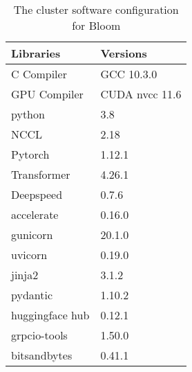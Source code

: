 \begin{table}[ht]
    \centering
    \caption{The cluster software configuration for Bloom}
    \begin{tabular}{ll}
        \toprule
        Libraries & Versions  \\
        \midrule
        C Compiler & GCC 10.3.0 \\
        GPU Compiler & CUDA nvcc 11.6 \\
        python & 3.8 \\
        NCCL & 2.18 \\
        Pytorch & 1.12.1 \\
        Transformer & 4.26.1 \\
        Deepspeed & 0.7.6 \\
        accelerate & 0.16.0  \\
        gunicorn & 20.1.0 \\
        uvicorn & 0.19.0 \\
        jinja2 & 3.1.2 \\
        pydantic & 1.10.2 \\
        huggingface hub & 0.12.1 \\
        grpcio-tools & 1.50.0 \\
        bitsandbytes & 0.41.1 \\

        \bottomrule
    \end{tabular}
    \label{table:software-GPU}
\end{table}